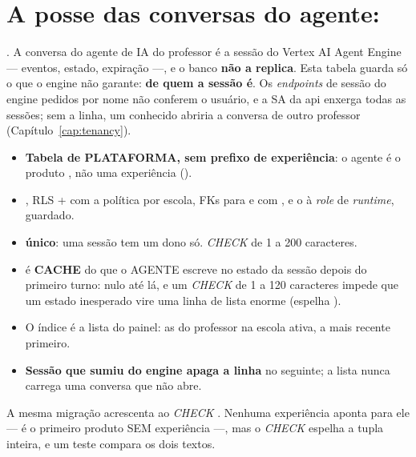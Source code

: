 \section{A posse das conversas do agente: }
\label{sec:agente-professor-dados}

. A conversa do agente de IA do professor é a sessão do Vertex AI
Agent Engine --- eventos, estado, expiração ---, e o banco \textbf{não a
replica}. Esta tabela guarda só o que o engine não garante: \textbf{de quem a
sessão é}. Os \emph{endpoints} de sessão do engine pedidos por nome não conferem o
usuário, e a SA da api enxerga todas as sessões; sem a linha, um 
conhecido abriria a conversa de outro professor (Capítulo~\ref{cap:tenancy}).

\begin{itemize}
  \item \textbf{Tabela de PLATAFORMA, sem prefixo de experiência}: o agente é o
    produto , não uma experiência
    ().
  \item {}, RLS  +  com a política por
    escola, FKs para  e  com , e o
     à \emph{role} de \emph{runtime}, guardado.
  \item {} \textbf{único}: uma sessão tem um dono só. \emph{CHECK} de
    1 a 200 caracteres.
  \item {} é \textbf{CACHE} do  que o AGENTE escreve
    no estado da sessão depois do primeiro turno: nulo até lá, e um \emph{CHECK}
    de 1 a 120 caracteres impede que um estado inesperado vire uma linha de lista
    enorme (espelha ).
  \item O índice  é a lista do
    painel: as do professor na escola ativa, a mais recente primeiro.
  \item \textbf{Sessão que sumiu do engine apaga a linha} no  seguinte;
    a lista nunca carrega uma conversa que não abre.
\end{itemize}

A mesma migração acrescenta  ao \emph{CHECK}
. Nenhuma experiência aponta para ele --- é o
primeiro produto SEM experiência ---, mas o \emph{CHECK} espelha a tupla
 inteira, e um teste compara os dois textos.

